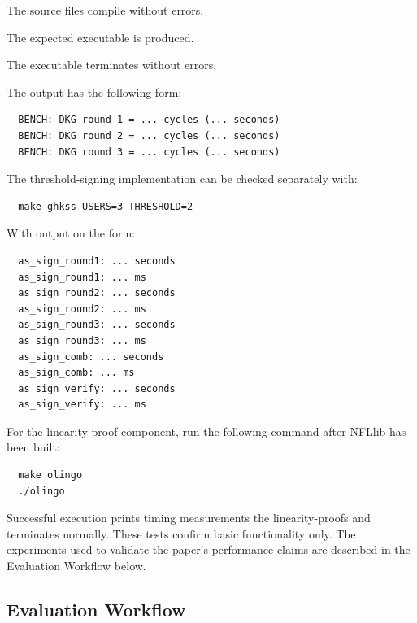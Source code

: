 \documentclass[nonacm,sigconf]{acmart}
\begin{document}
\begin{compactitem}
  \item The source files compile without errors.
  \item The expected executable is produced.
  \item The executable terminates without errors.
\end{compactitem}

The output has the following form:

\begin{verbatim}
  BENCH: DKG round 1 = ... cycles (... seconds)
  BENCH: DKG round 2 = ... cycles (... seconds)
  BENCH: DKG round 3 = ... cycles (... seconds)
\end{verbatim}

The threshold-signing implementation can be checked separately with:

\begin{verbatim}
  make ghkss USERS=3 THRESHOLD=2
\end{verbatim}

With output on the form:
\begin{verbatim}
  as_sign_round1: ... seconds
  as_sign_round1: ... ms
  as_sign_round2: ... seconds
  as_sign_round2: ... ms
  as_sign_round3: ... seconds
  as_sign_round3: ... ms
  as_sign_comb: ... seconds
  as_sign_comb: ... ms
  as_sign_verify: ... seconds
  as_sign_verify: ... ms
\end{verbatim}

For the linearity-proof component, run the following command after NFLlib has been built:

\begin{verbatim}
  make olingo
  ./olingo
\end{verbatim}

Successful execution prints timing measurements the linearity-proofs and terminates normally. These tests confirm basic functionality only. The experiments used to validate the paper's performance claims are described in the Evaluation Workflow below.

\subsection{Evaluation Workflow}

\end{document}
